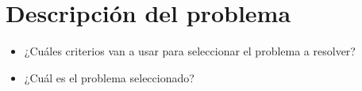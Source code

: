 \section{Descripción del problema}

\begin{tcolorbox}[colback=yellow!10!white,colframe=red!75!black,title=Recomendaciones]
  \begin{itemize}
      \item ¿Cuáles criterios van a usar para seleccionar el problema a resolver?
      \item ¿Cuál es el problema seleccionado?
  \end{itemize}
\end{tcolorbox}

\pagebreak
